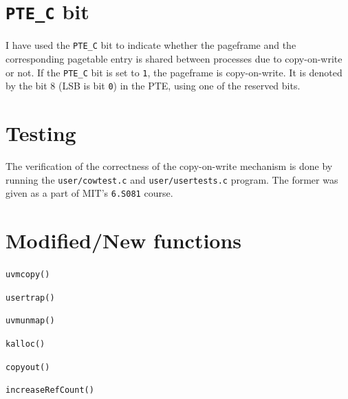 \documentclass[12pt,a4paper,english]{paper}
\begin{document}
\section{\texttt{PTE\_C} bit}
I have used the \texttt{PTE\_C} bit to indicate whether the pageframe and the corresponding pagetable entry is shared between processes due to copy-on-write or not. If the \texttt{PTE\_C} bit is set to {\tt 1}, the pageframe is copy-on-write. It is denoted by the bit 8 (LSB is bit {\tt 0}) in the PTE, using one of the reserved bits.

\section{Testing}
The verification of the correctness of the copy-on-write mechanism is done by running the \texttt{user/cowtest.c} and \texttt{user/usertests.c} program. The former was given as a part of MIT's \texttt{6.S081} course.

\section{Modified/New functions}
\begin{compactitem}
    \item{\texttt{uvmcopy()}}
    \item{\texttt{usertrap()}}
    \item{\texttt{uvmunmap()}}
    \item{\texttt{kalloc()}}
    \item{\texttt{copyout()}}
    \item{\texttt{increaseRefCount()}}
\end{compactitem}




%
%
\end{document}
